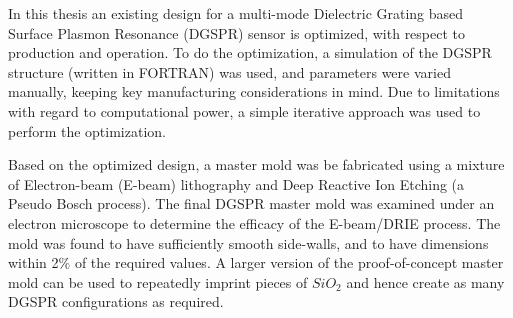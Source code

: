 % 
% 
%
In this thesis an existing design for a multi-mode Dielectric Grating based Surface Plasmon Resonance (DGSPR) sensor is optimized, with respect to production and operation. To do the optimization, a simulation of the DGSPR structure (written in FORTRAN) was used, and parameters were varied manually, keeping key manufacturing considerations in mind. Due to limitations with regard to computational power, a simple iterative approach was used to perform the optimization. 

Based on the optimized design, a master mold was be fabricated using a mixture of Electron-beam (E-beam) lithography and Deep Reactive Ion Etching (a Pseudo Bosch process). The final DGSPR master mold was examined under an electron microscope to determine the efficacy of the E-beam/DRIE process. The mold was found to have sufficiently smooth side-walls, and to have dimensions within 2\% of the required values. A larger version of the proof-of-concept master mold can be used to repeatedly imprint pieces of $SiO_2$ and hence create as many DGSPR configurations as required.